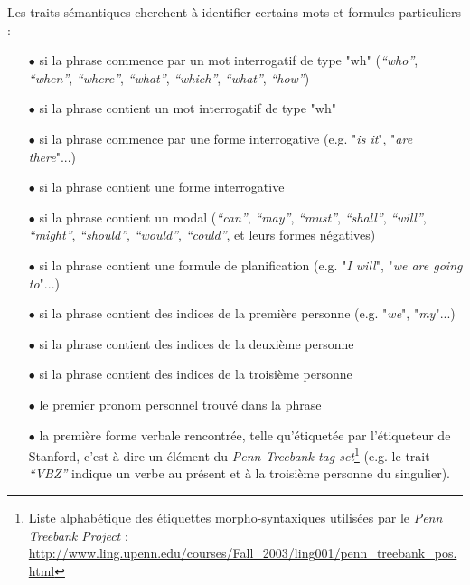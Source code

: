 Les traits sémantiques cherchent à identifier certains mots et formules particuliers : 

\begin{itemize}
	\item[$\bullet$] si la phrase commence par un mot interrogatif de type "wh" (\textit{``who''}, \textit{``when''}, \textit{``where''}, \textit{``what''}, \textit{``which''}, \textit{``what''}, \textit{``how''})
	\item[$\bullet$] si la phrase contient un mot interrogatif de type "wh"
	\item[$\bullet$] si la phrase commence par une forme interrogative (e.g. "\textit{is it}", "\textit{are there}"...)
	\item[$\bullet$] si la phrase contient une forme interrogative
	\item[$\bullet$] si la phrase contient un modal (\textit{``can''}, \textit{``may''}, \textit{``must''}, \textit{``shall''}, \textit{``will''}, \textit{``might''}, \textit{``should''}, \textit{``would''}, \textit{``could''}, et leurs formes négatives)
	\item[$\bullet$] si la phrase contient une formule de planification (e.g. "\textit{I will}", "\textit{we are going to}"...)
	\item[$\bullet$] si la phrase contient des indices de la première personne (e.g. "\textit{we}", "\textit{my}"...)
	\item[$\bullet$] si la phrase contient des indices de la deuxième personne
	\item[$\bullet$] si la phrase contient des indices de la troisième personne
	\item[$\bullet$] le premier pronom personnel trouvé dans la phrase
	\item[$\bullet$] la première forme verbale rencontrée, telle qu'étiquetée par l'étiqueteur de Stanford, c'est à dire un élément du \textit{Penn Treebank tag set}\footnote{Liste alphabétique des étiquettes morpho-syntaxiques utilisées par le \textit{Penn Treebank Project} : \url{http://www.ling.upenn.edu/courses/Fall_2003/ling001/penn_treebank_pos.html}} (e.g. le trait \textit{``VBZ''} indique un verbe au présent et à la troisième personne du singulier).
\end{itemize}

